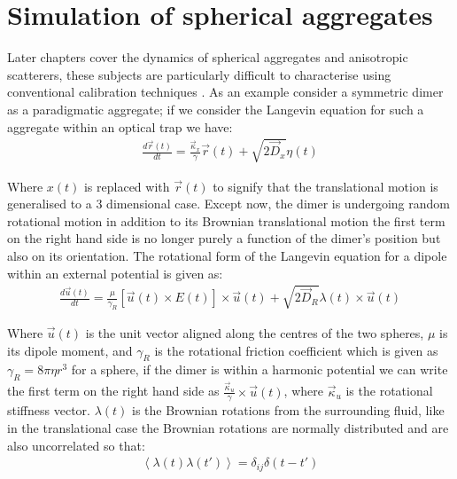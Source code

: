 \section{Simulation of spherical aggregates}

Later chapters cover the dynamics of spherical aggregates and anisotropic 
scatterers, these subjects are particularly difficult to characterise 
using conventional calibration techniques \cite{Li2008, Yogesha2011PreciseCO}. 
As an example consider a symmetric dimer as a paradigmatic aggregate; 
if we consider the Langevin equation for such a aggregate within an optical 
trap we have:
\begin{align}
\frac{{d}\vec{r}(t)}{{dt}} = \frac{\vec{\kappa}_x}{\gamma}\vec{r}(t) + \sqrt{2\vec{D}_x}\eta(t)
\end{align}

Where $x(t)$ is replaced with $\vec{r}(t)$ to signify that the translational 
motion is generalised to a 3 dimensional case. Except now, the dimer 
is undergoing random rotational motion in addition to its Brownian 
translational motion the first term on the right hand side is no longer 
purely a function of the dimer's position but also on its orientation. 
The rotational form of the Langevin equation for a dipole within an external 
potential is given as:
\begin{align}
  \frac{{d}\vec{u}(t)}{{dt}}
  =
  \frac{\mu}{\gamma_R}\left[\vec{u}(t)\times E(t)\right]\times \vec{u}(t)
  + \sqrt{2\vec{D}_R}\lambda(t)\times \vec{u}(t)
\end{align}

Where $\vec{u}(t)$ is the unit vector aligned along the centres of the 
two spheres, $\mu$ is its dipole moment, and $\gamma_R$ is the rotational 
friction coefficient which is given as $\gamma_R = 8\pi\eta r^3$ for a 
sphere, if the dimer is within a harmonic potential we can write the first 
term on the right hand side as $\frac{\vec{\kappa}_u}{\gamma} \times 
\vec{u}(t)$, where $\vec{\kappa}_u$ is the rotational stiffness vector. 
$\lambda(t)$ is the Brownian rotations from the surrounding fluid, 
like in the translational case the Brownian rotations are normally 
distributed and are also uncorrelated so that:
\begin{align}
  \left<\lambda(t)\lambda(t')\right> = \delta_{ij}\delta(t-t')
\end{align}

